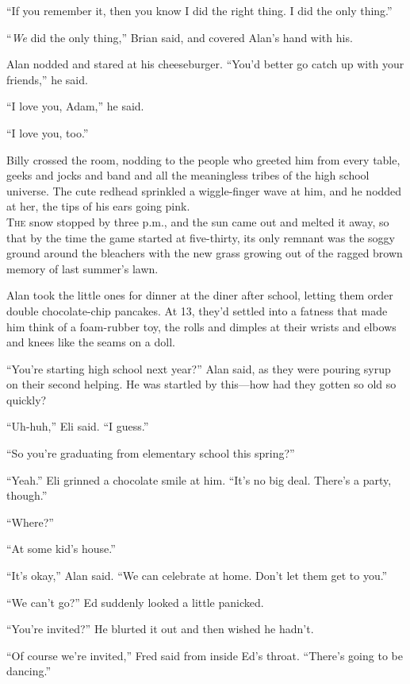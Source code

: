 ``If you remember it, then you know I did the right thing.  I did the
only thing.''

``\textit{We} did the only thing,'' Brian said, and covered Alan's
hand with his.

Alan nodded and stared at his cheeseburger.  ``You'd better go catch
up with your friends,'' he said.

``I love you, Adam,'' he said.

``I love you, too.''

Billy crossed the room, nodding to the people who greeted him from
every table, geeks and jocks and band and all the meaningless tribes
of the high school universe.  The cute redhead sprinkled a
wiggle-finger wave at him, and he nodded at her, the tips of his ears
going pink.
\\
\lettrine[lines=3, lhang=.5, nindent=0pt, findent=2pt]{T}{he} snow stopped by three p.m., and the sun came out and melted it
away, so that by the time the game started at five-thirty, its only
remnant was the soggy ground around the bleachers with the new grass
growing out of the ragged brown memory of last summer's lawn.

Alan took the little ones for dinner at the diner after school,
letting them order double chocolate-chip pancakes.  At 13, they'd
settled into a fatness that made him think of a foam-rubber toy, the
rolls and dimples at their wrists and elbows and knees like the seams
on a doll.

``You're starting high school next year?'' Alan said, as they were
pouring syrup on their second helping.  He was startled by this---how
had they gotten so old so quickly?

``Uh-huh,'' Eli said.  ``I guess.''

``So you're graduating from elementary school this spring?''

``Yeah.'' Eli grinned a chocolate smile at him.  ``It's no big deal. 
There's a party, though.''

``Where?''

``At some kid's house.''

``It's okay,'' Alan said.  ``We can celebrate at home.  Don't let them
get to you.''

``We can't go?'' Ed suddenly looked a little panicked.

``You're invited?'' He blurted it out and then wished he hadn't.

``Of course we're invited,'' Fred said from inside Ed's throat. 
``There's going to be dancing.''

